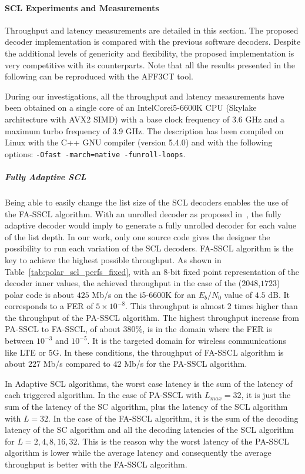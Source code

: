 \paragraph{SCL Experiments and Measurements}

Throughput and latency measurements are detailed in this section. The proposed
decoder implementation is compared with the previous software decoders. Despite
the additional levels of genericity and flexibility, the proposed implementation
is very competitive with its counterparts. Note that all the results presented
in the following can be reproduced with the AFF3CT tool.

During our investigations, all the throughput and latency measurements have been
obtained on a single core of an Intel\R Core\TM i5-6600K CPU (Skylake
architecture with AVX2 SIMD) with a base clock frequency of 3.6 GHz and a
maximum turbo frequency of 3.9 GHz. The description has been compiled on Linux
with the C++ GNU compiler (version 5.4.0) and with the following options:
\texttt{-Ofast -march=native -funroll-loops}.

\subparagraph{Fully Adaptive SCL}

Being able to easily change the list size of the SCL decoders enables the use of
the FA-SSCL algorithm. With an unrolled decoder as proposed
in~\cite{Sarkis2016}, the fully adaptive decoder would imply to generate a fully
unrolled decoder for each value of the list depth. In our work, only one source
code gives the designer the possibility to run each variation of the SCL
decoders. FA-SSCL algorithm is the key to achieve the highest possible
throughput. As shown in Table~\ref{tab:polar_scl_perfs_fixed}, with an 8-bit
fixed point representation of the decoder inner values, the achieved throughput
in the case of the ($2048$,$1723$) polar code is about $425$ Mb/s on the
i5-6600K for an $E_b/N_0$ value of $4.5$ dB. It corresponds to a FER of
$5\times10^{-8}$. This throughput is almost 2 times higher than the throughput
of the PA-SSCL algorithm. The highest throughput increase from PA-SSCL to
FA-SSCL, of about $380\%$, is in the domain where the FER is between $10^{-3}$
and $10^{-5}$. It is the targeted domain for wireless communications like LTE or
5G. In these conditions, the throughput of FA-SSCL algorithm is about $227$ Mb/s
compared to $42$ Mb/s for the PA-SSCL algorithm.

In Adaptive SCL algorithms, the worst case latency is the sum of the latency of
each triggered algorithm. In the case of PA-SSCL with $L_{max}=32$, it is just
the sum of the latency of the SC algorithm, plus the latency of the SCL
algorithm with $L=32$. In the case of the FA-SSCL algorithm, it is the sum of
the decoding latency of the SC algorithm and all the decoding latencies of the
SCL algorithm for $L={2,4,8,16,32}$. This is the reason why the worst latency of
the PA-SSCL algorithm is lower while the average latency and consequently the
average throughput is better with the FA-SSCL algorithm.


